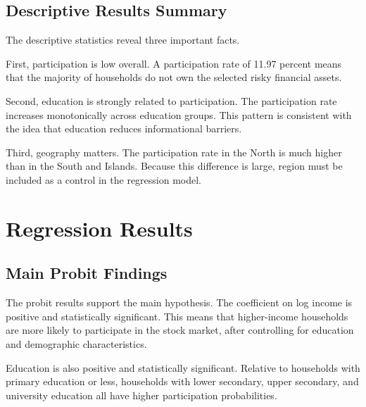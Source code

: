 \documentclass[12pt]{article}
\begin{document}
\subsection{Descriptive Results Summary}

The descriptive statistics reveal three important facts.

First, participation is low overall. A participation rate of 11.97 percent means that the majority of households do not own the selected risky financial assets.

Second, education is strongly related to participation. The participation rate increases monotonically across education groups. This pattern is consistent with the idea that education reduces informational barriers.

Third, geography matters. The participation rate in the North is much higher than in the South and Islands. Because this difference is large, region must be included as a control in the regression model.

\section{Regression Results}

\subsection{Main Probit Findings}

The probit results support the main hypothesis. The coefficient on log income is positive and statistically significant. This means that higher-income households are more likely to participate in the stock market, after controlling for education and demographic characteristics.

Education is also positive and statistically significant. Relative to households with primary education or less, households with lower secondary, upper secondary, and university education all have higher participation probabilities.
\end{document}
